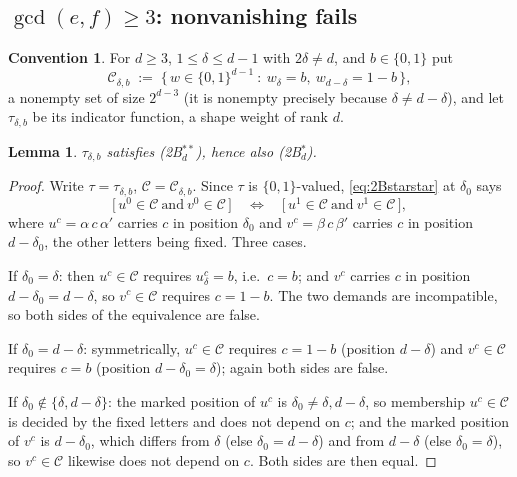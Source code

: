 \documentclass[11pt]{article}
\newtheorem{lemma}[theorem]{Lemma}
\theoremstyle{definition}
\newtheorem{convention}[theorem]{Convention}
\theoremstyle{remark}
\newcommand{\Cset}{\mathcal{C}}
\begin{document}
\subsection{$\gcd(e,f)\ge3$: nonvanishing fails}

\begin{convention}\label{conv:C}
For $d\ge3$, $1\le\delta\le d-1$ with $2\delta\ne d$, and $b\in\{0,1\}$ put
\[
   \Cset_{\delta,b}\;:=\;\bigl\{\,w\in\{0,1\}^{d-1}\ :\ w_\delta=b,\ w_{d-\delta}=1-b\,\bigr\},
\]
a nonempty set of size $2^{d-3}$ (it is nonempty precisely because $\delta\ne d-\delta$),
and let $\tau_{\delta,b}$ be its indicator function, a shape weight of rank $d$.
\end{convention}

\begin{lemma}\label{lem:Ctau}
$\tau_{\delta,b}$ satisfies \textnormal{(2B$^{**}_d$)}, hence also
\textnormal{(2B$^{*}_d$)}.
\end{lemma}

\begin{proof}
Write $\tau=\tau_{\delta,b}$, $\Cset=\Cset_{\delta,b}$.  Since $\tau$ is $\{0,1\}$-valued,
\eqref{eq:2Bstarstar} at $\delta_0$ says
\[
   \bigl[\,u^{0}\in\Cset\ \text{and}\ v^{0}\in\Cset\,\bigr]
   \quad\Longleftrightarrow\quad
   \bigl[\,u^{1}\in\Cset\ \text{and}\ v^{1}\in\Cset\,\bigr],
\]
where $u^{c}=\alpha\,c\,\alpha'$ carries $c$ in position $\delta_0$ and
$v^{c}=\beta\,c\,\beta'$ carries $c$ in position $d-\delta_0$, the other letters being
fixed.  Three cases.

If $\delta_0=\delta$: then $u^{c}\in\Cset$ requires $u^c_\delta=b$, i.e.\ $c=b$; and
$v^{c}$ carries $c$ in position $d-\delta_0=d-\delta$, so $v^{c}\in\Cset$ requires
$c=1-b$.  The two demands are incompatible, so both sides of the equivalence are false.

If $\delta_0=d-\delta$: symmetrically, $u^{c}\in\Cset$ requires $c=1-b$ (position
$d-\delta$) and $v^{c}\in\Cset$ requires $c=b$ (position $d-\delta_0=\delta$); again both
sides are false.

If $\delta_0\notin\{\delta,d-\delta\}$: the marked position of $u^{c}$ is $\delta_0\ne
\delta,d-\delta$, so membership $u^{c}\in\Cset$ is decided by the fixed letters and does not
depend on $c$; and the marked position of $v^{c}$ is $d-\delta_0$, which differs from
$\delta$ (else $\delta_0=d-\delta$) and from $d-\delta$ (else $\delta_0=\delta$), so
$v^{c}\in\Cset$ likewise does not depend on $c$.  Both sides are then equal.
\end{proof}
\end{document}
